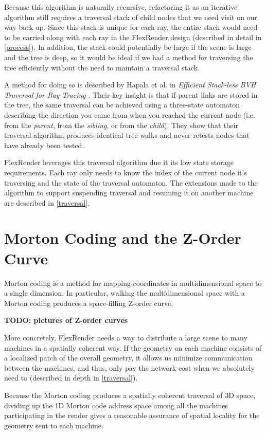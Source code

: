 \documentclass[12pt]{ucthesis}
\begin{document}
Because this algorithm is naturally recursive, refactoring it as an iterative
algorithm still requires a traversal stack of child nodes that we need visit on
our way back up. Since this stack is unique for
each ray, the entire stack would need to be carried along with each ray in the
FlexRender design (described in detail in \ref{process}). In addition, the
stack could potentially be large if the scene is large and the tree is deep, so
it would be ideal if we had a method for traversing the tree efficiently without
the need to maintain a traversal stack.

A method for doing so is described by Hapala et al. in
\emph{Efficient Stack-less BVH Traversal for Ray Tracing} \cite{hapala:2011}.
Their key insight is that if parent links are stored in the tree, the same
traversal can be achieved using a three-state automaton describing the direction
you came from when you reached the current node (i.e. from the \emph{parent},
from the \emph{sibling}, or from the \emph{child}). They show that their
traversal algorithm produces identical tree walks and never retests nodes that
have already been tested.

FlexRender leverages this traversal algorithm due it its low state storage
requirements. Each ray only needs to know the index of the current node it's
traversing and the state of the traversal automaton. The extensions made
to the algorithm to support suspending traversal and resuming it on another
machine are described in \ref{traversal}.

\section{Morton Coding and the Z-Order Curve}
\label{morton}

Morton coding is a method for mapping coordinates in multidimensional space to
a single dimension. In particular, walking the multidimensional space with a
Morton coding produces a space-filling Z-order curve.

\textbf{TODO: pictures of Z-order curves}

More concretely, FlexRender needs a way to distribute a large scene to many
machines in a spatially coherent way. If the geometry on each machine consists
of a localized patch of the overall geometry, it allows us minimize communication
between the machines, and thus, only pay the network cost when we absolutely need
to (described in depth in \ref{traversal}).

Because the Morton coding produces a spatially coherent traversal of 3D space,
dividing up the 1D Morton code address space among all the machines participating
in the render gives a reasonable assurance of spatial locality for the geometry
sent to each machine.
\end{document}
